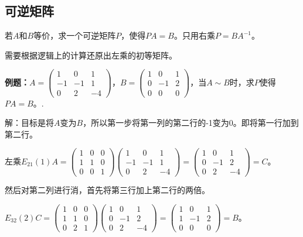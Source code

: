 \documentclass[UTF8, 12pt]{ctexart}
\begin{document}
\subsection{可逆矩阵}

若$A$和$B$等价，求一个可逆矩阵$P$，使得$PA=B$。只用右乘$P=BA^{-1}$。

需要根据逻辑上的计算还原出左乘的初等矩阵。\medskip

\textbf{例题：}$A=\left(\begin{array}{ccc}
    1 & 0 & 1 \\
    -1 & -1 & 1 \\
    0 & 2 & -4
\end{array}\right)$，$B=\left(\begin{array}{ccc}
    1 & 0 & 1 \\
    0 & -1 & 2 \\
    0 & 0 & 0
\end{array}\right)$，当$A\sim B$时，求$P$使得$PA=B$。.

解：目标是将$A$变为$B$，所以第一步将第一列的第二行的-1变为0。即将第一行加到第二行。

左乘$E_{21}(1)A=\left(\begin{array}{ccc}
    1 & 0 & 0 \\
    1 & 1 & 0 \\
    0 & 0 & 1
\end{array}\right)\left(\begin{array}{ccc}
    1 & 0 & 1 \\
    -1 & -1 & 1 \\
    0 & 2 & -4
\end{array}\right)=\left(\begin{array}{ccc}
    1 & 0 & 1 \\
    0 & -1 & 2 \\
    0 & 2 & -4
\end{array}\right)=C$。\medskip

然后对第二列进行消，首先将第三行加上第二行的两倍。

$E_{32}(2)C=\left(\begin{array}{ccc}
    1 & 0 & 0 \\
    1 & 1 & 0 \\
    0 & 2 & 1
\end{array}\right)\left(\begin{array}{ccc}
    1 & 0 & 1 \\
    0 & -1 & 2 \\
    0 & 2 & -4
\end{array}\right)=\left(\begin{array}{ccc}
    1 & 0 & 1 \\
    1 & -1 & 2 \\
    0 & 0 & 0
\end{array}\right)=B$。\medskip
\end{document}

